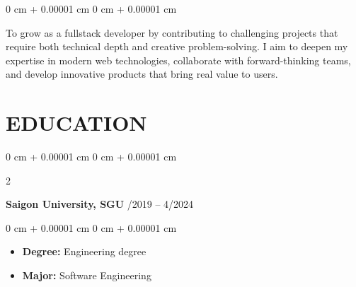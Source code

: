\documentclass[10pt, letterpaper]{article}
\newenvironment{highlights}{
    \begin{itemize}[
        topsep=0.10 cm,
        parsep=0.10 cm,
        partopsep=0pt,
        itemsep=0pt,
        leftmargin=0 cm + 10pt
    ]
}{
    \end{itemize}
} %
\newenvironment{onecolentry}{
    \begin{adjustwidth}{
        0 cm + 0.00001 cm
    }{
        0 cm + 0.00001 cm
    }
}{
    \end{adjustwidth}
} %
\newenvironment{twocolentry}[2][]{
    \onecolentry
    \def\secondColumn{#2}
    \setcolumnwidth{\fill, 4.5 cm}
    \begin{paracol}{2}
}{
    \switchcolumn \raggedleft \secondColumn
    \end{paracol}
    \endonecolentry
} %
\begin{document}
        \begin{onecolentry}
         To grow as a fullstack developer by contributing to challenging projects that require both technical depth and creative problem-solving. I aim to deepen my expertise in modern web technologies, collaborate with forward-thinking teams, and develop innovative products that bring real value to users.
        \end{onecolentry}
    \section{EDUCATION}
        \begin{twocolentry}{
            9/2019 – 4/2024
        }
            \textbf{Saigon University, SGU}\end{twocolentry}

        \vspace{0.10 cm}
        \begin{onecolentry}
            \begin{highlights}
                \item \textbf{Degree:} Engineering degree
                \item \textbf{Major:} Software Engineering
            \end{highlights}
        \end{onecolentry}
\end{document}

